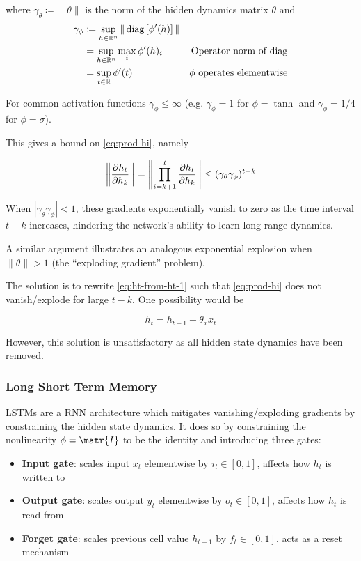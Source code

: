 where $\gamma_\theta \coloneqq \|\theta\|$ is the norm of the hidden dynamics matrix $\theta$
and
\begin{align}
    \gamma_\phi
    &\coloneqq \sup_{h \in \mathbb{R}^n} \| \operatorname*{diag} \left[ \phi'(h) \right] \|  &\\
    &= \sup_{h \in \mathbb{R}^n} \max_i \phi'(h)_i &\mbox{Operator norm of diag} \\
    &= \sup_{t \in \mathbb{R}} \phi'(t) &\mbox{$\phi$ operates elementwise}
\end{align}

For common activation functions $\gamma_{\phi} \leq \infty$ (e.g. $\gamma_\phi = 1$ for $\phi = \tanh$
and $\gamma_\phi = 1/4$ for $\phi = \sigma$).

This gives a bound on \autoref{eq:prod-hi}, namely

\begin{equation}
    \left\| \frac{\partial h_t}{\partial h_k} \right\|
    = \left\| \prod_{i=k+1}^{t} \frac{\partial h_t}{\partial h_k} \right\|
    \leq (\gamma_\theta \gamma_\phi)^{t-k}
\end{equation}

When $|\gamma_\theta \gamma_\phi| < 1$, these gradients exponentially vanish to zero as
the time interval $t - k$ increases, hindering the network's ability to learn long-range
dynamics.

A similar argument \cite{Bengio1994} illustrates an analogous exponential explosion
when $\|\theta\| > 1$ (the ``exploding gradient'' problem).

The solution is to rewrite \autoref{eq:ht-from-ht-1} such that
\autoref{eq:prod-hi} does not vanish/explode for large $t - k$.
One possibility would be

\begin{equation}
    h_t = h_{t-1} + \theta_x x_t
\end{equation}

However, this solution is unsatisfactory as all hidden state dynamics have been
removed.

\subsubsection{Long Short Term Memory}

LSTMs are a RNN architecture which mitigates vanishing/exploding gradients by constraining
the hidden state dynamics. It does so by constraining the nonlinearity $\phi = \matr{I}$ to be the
identity and introducing three gates:
\begin{itemize}
    \item \textbf{Input gate}: scales input $x_t$ elementwise by $i_t \in [0,1]$, affects how $h_t$ is written to
    \item \textbf{Output gate}: scales output $y_t$ elementwise by $o_t \in [0,1]$, affects how $h_t$ is read from
    \item \textbf{Forget gate}: scales previous cell value $h_{t-1}$ by $f_t \in [0,1]$, acts as a reset mechanism
\end{itemize}

